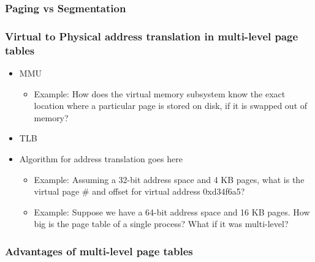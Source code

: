 \documentclass[11pt]{article}
\begin{document}
\subsubsection{Paging vs Segmentation}
\label{sec-5.5.2}

\subsubsection{Virtual to Physical address translation in multi-level page tables}
\label{sec-5.5.3}

\begin{itemize}

\item MMU\\
\label{sec-5.5.3.1}

\begin{itemize}

\item Example: How does the virtual memory subsystem know the exact location where a particular page is stored on disk, if it is swapped out of memory?\\
\label{sec-5.5.3.1.1}

\end{itemize} %

\item TLB\\
\label{sec-5.5.3.2}


\item Algorithm for address translation goes here\\
\label{sec-5.5.3.3}

\begin{itemize}

\item Example: Assuming a 32-bit address space and 4 KB pages, what is the virtual page \# and offset for virtual address 0xd34f6a5?\\
\label{sec-5.5.3.3.1}


\item Example: Suppose we have a 64-bit address space and 16 KB pages. How big is the page table of a single process? What if it was multi-level?\\
\label{sec-5.5.4.1}

\end{itemize} %
\end{itemize} %
\subsubsection{Advantages of multi-level page tables}
\label{sec-5.5.4}
\end{document}
